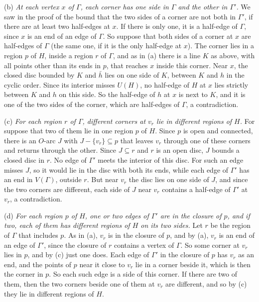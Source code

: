 {\hspace*{12pt}(b) \textit{At each vertex $x$ of $\Gamma$, each corner has one side in $\Gamma$ and the other in $\Gamma'$.} We saw in the proof of the bound that the two sides of a corner are not both in $\Gamma'$, if there are at least two half-edges at $x$. If there is only one, it is a half-edge of $\Gamma$, since $x$ is an end of an edge of $\Gamma$. So suppose that both sides of a corner at $x$ are half-edges of $\Gamma$ (the same one, if it is the only half-edge at $x$). The corner lies in a region $p$ of $H$, inside a region $r$ of $\Gamma$, and as in (a) there is a line $K$ as above, with all points other than its ends in $p$, that reaches $x$ inside this corner. Near $x$, the closed disc bounded by $K$ and $\bar{h}$ lies on one side of $K$, between $K$ and $h$ in the cyclic order. Since its interior misses $U(H)$, no half-edge of $H$ at $x$ lies strictly between $K$ and $h$ on this side. So the half-edge of $h$ at $x$ is next to $K$, and it is one of the two sides of the corner, which are half-edges of $\Gamma$, a contradiction.

\hspace*{12pt}(c) \textit{For each region $r$ of $\Gamma$, different corners at $v_r$ lie in different regions of $H$.} For suppose that two of them lie in one region $p$ of $H$. Since $p$ is open and connected, there is an $O$-arc $J$ with $J - \{v_r\} \subseteq p$ that leaves $v_r$ through one of these corners and returns through the other. Since $J \subseteq r$ and $r$ is an open disc, $J$ bounds a closed disc in $r$. No edge of $\Gamma'$ meets the interior of this disc. For such an edge misses $J$, so it would lie in the disc with both its ends, while each edge of $\Gamma'$ has an end in $V(\Gamma)$, outside $r$. But near $v_r$ the disc lies on one side of $J$, and since the two corners are different, each side of $J$ near $v_r$ contains a half-edge of $\Gamma'$ at $v_r$, a contradiction.

\hspace*{12pt}(d) \textit{For each region $p$ of $H$, one or two edges of $\Gamma'$ are in the closure of $p$, and if two, each of them has different regions of $H$ on its two sides.} Let $r$ be the region of $\Gamma$ that includes $p$. As in (a), $v_r$ is in the closure of $p$, and by (a), $v_r$ is an end of an edge of $\Gamma'$, since the closure of $r$ contains a vertex of $\Gamma$. So some corner at $v_r$ lies in $p$, and by (c) just one does. Each edge of $\Gamma'$ in the closure of $p$ has $v_r$ as an end, and the points of $p$ near it close to $v_r$ lie in a corner beside it, which is then the corner in $p$. So each such edge is a side of this corner. If there are two of them, then the two corners beside one of them at $v_r$ are different, and so by (c) they lie in different regions of $H$.

}
